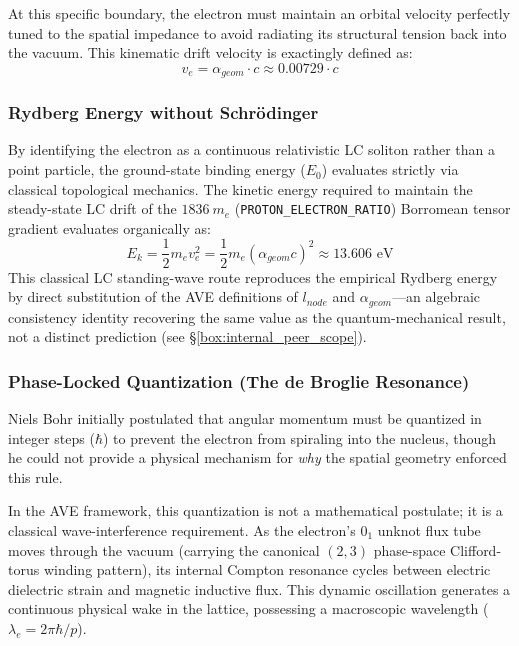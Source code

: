 At this specific boundary, the electron must maintain an orbital velocity perfectly tuned to the spatial impedance to avoid radiating its structural tension back into the vacuum. This kinematic drift velocity is exactingly defined as:
\begin{equation}
v_e = \alpha_{geom} \cdot c \approx 0.00729 \cdot c
\end{equation}

\subsubsection{Rydberg Energy without Schrödinger}
By identifying the electron as a continuous relativistic LC soliton rather than a point particle, the ground-state binding energy ($E_0$) evaluates strictly via classical topological mechanics. The kinetic energy required to maintain the steady-state LC drift of the $1836 \: m_e$ (\texttt{PROTON\_ELECTRON\_RATIO}) Borromean tensor gradient evaluates organically as:
\begin{equation}
E_k = \frac{1}{2} m_e v_e^2 = \frac{1}{2} m_e (\alpha_{geom} c)^2 \approx 13.606 \text{ eV}
\end{equation}
This classical LC standing-wave route reproduces the empirical Rydberg energy by direct substitution of the AVE definitions of $l_{node}$ and $\alpha_{geom}$---an algebraic consistency identity recovering the same value as the quantum-mechanical result, not a distinct prediction (see \S\ref{box:internal_peer_scope}).




\subsubsection{Phase-Locked Quantization (The de Broglie Resonance)}
Niels Bohr initially postulated that angular momentum must be quantized in integer steps ($\hbar$) to prevent the electron from spiraling into the nucleus, though he could not provide a physical mechanism for \textit{why} the spatial geometry enforced this rule.

In the AVE framework, this quantization is not a mathematical postulate; it is a classical wave-interference requirement. As the electron's $0_1$ unknot flux tube moves through the vacuum (carrying the canonical $(2,3)$ phase-space Clifford-torus winding pattern), its internal Compton resonance cycles between electric dielectric strain and magnetic inductive flux. This dynamic oscillation generates a continuous physical wake in the lattice, possessing a macroscopic wavelength ($\lambda_e = 2\pi\hbar / p$).

